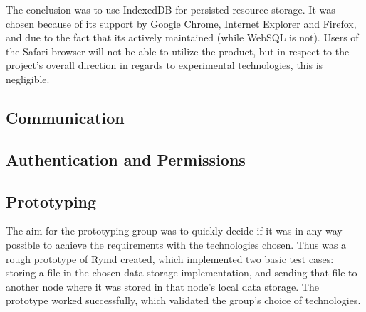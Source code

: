 The conclusion was to use IndexedDB for persisted resource storage. It was chosen because of its support by Google Chrome, Internet Explorer and Firefox, and due to the fact that its actively maintained (while WebSQL is not). Users of the Safari browser will not be able to utilize the product, but in respect to the project's overall direction in regards to experimental technologies, this is negligible.

\subsection{Communication}

\subsection{Authentication and Permissions}

\subsection{Prototyping}
The aim for the prototyping group was to quickly decide if it was in any way possible to achieve the requirements with the technologies chosen. Thus was a rough prototype of Rymd created, which implemented two basic test cases: storing a file in the chosen data storage implementation, and sending that file to another node where it was stored in that node's local data storage. The prototype worked successfully, which validated the group's choice of technologies.
